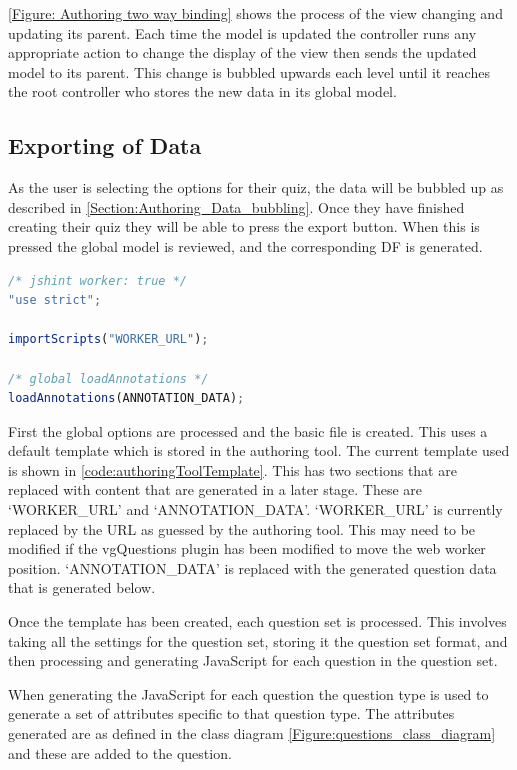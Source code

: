 \autoref{Figure: Authoring two way binding} shows the process of the view changing and updating its parent. Each time the model is updated the controller runs any appropriate action to change the display of the view then sends the updated model to its parent. This change is bubbled upwards each level until it reaches the root controller who stores the new data in its global model.

\subsection{Exporting of Data}
\label{Section:Authoring_export_data}

As the user is selecting the options for their quiz, the data will be bubbled up as described in \autoref{Section:Authoring_Data_bubbling}. Once they have finished creating their quiz they will be able to press the export button. When this is pressed the global model is reviewed, and the corresponding \gls{DF} is generated.
\begin{lstlisting}[language=javascript,caption={Base template for authoring tool \gls{DF} generation},label={code:authoringToolTemplate} ]
/* jshint worker: true */
"use strict";

importScripts("WORKER_URL");

/* global loadAnnotations */
loadAnnotations(ANNOTATION_DATA);
\end{lstlisting}

First the global options are processed and the basic file is created. This uses a default template which is stored in the authoring tool. The current template used is shown in \autoref{code:authoringToolTemplate}. This has two sections that are replaced with content that are generated in a later stage. These are `WORKER\_URL' and `ANNOTATION\_DATA'. `WORKER\_URL' is currently replaced by the URL as guessed by the authoring tool. This may need to be modified if the vgQuestions plugin has been modified to move the web worker position. `ANNOTATION\_DATA' is replaced with the generated question data that is generated below.

Once the template has been created, each question set is processed. This involves taking all the settings for the question set, storing it the question set format, and then processing and generating JavaScript for each question in the question set.

When generating the JavaScript for each question the question type is used to generate a set of attributes specific to that question type. The attributes generated are as defined in the class diagram \autoref{Figure:questions_class_diagram} and these are added to the question.

